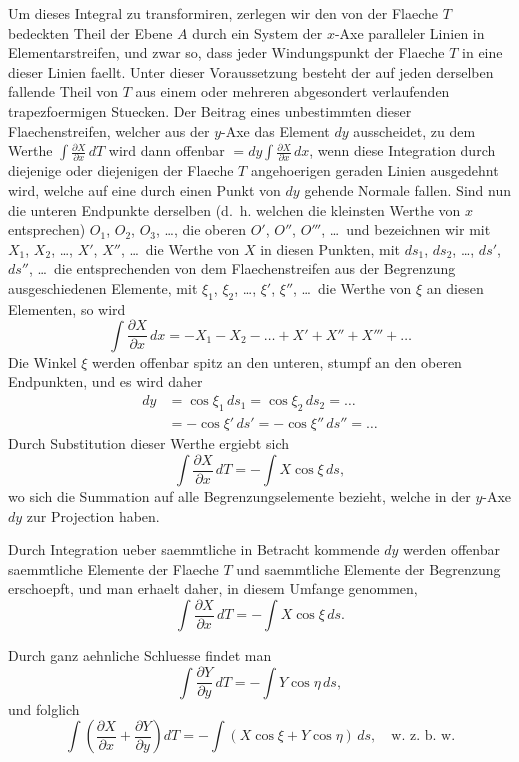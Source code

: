 \documentclass[11pt,a4paper]{article}
\theoremstyle{plain}
\theoremstyle{definition}
\begin{document}
Um dieses Integral zu transformiren, zerlegen wir den von der Flaeche $T$ bedeckten Theil der Ebene $A$ durch ein System der $x$-Axe paralleler Linien in Elementarstreifen, und zwar so, dass jeder Windungspunkt der Flaeche $T$ in eine dieser Linien faellt. Unter dieser Voraussetzung besteht der auf jeden derselben fallende Theil von $T$ aus einem oder mehreren abgesondert verlaufenden trapezfoermigen Stuecken. Der Beitrag eines unbestimmten dieser Flaechenstreifen, welcher aus der $y$-Axe das Element $dy$ ausscheidet, zu dem Werthe $\int \frac{\partial X}{\partial x} \, dT$ wird dann offenbar $= dy \int \frac{\partial X}{\partial x} \, dx$, wenn diese Integration durch diejenige oder diejenigen der Flaeche $T$ angehoerigen geraden Linien ausgedehnt wird, welche auf eine durch einen Punkt von $dy$ gehende Normale fallen. Sind nun die unteren Endpunkte derselben (d.\ h. welchen die kleinsten Werthe von $x$ entsprechen) $O_1$, $O_2$, $O_3$, \dots, die oberen $O'$, $O''$, $O'''$, \dots\ und bezeichnen wir mit $X_1$, $X_2$, \dots, $X'$, $X''$, \dots\ die Werthe von $X$ in diesen Punkten, mit $ds_1$, $ds_2$, \dots, $ds'$, $ds''$, \dots\ die entsprechenden von dem Flaechenstreifen aus der Begrenzung ausgeschiedenen Elemente, mit $\xi_1$, $\xi_2$, \dots, $\xi'$, $\xi''$, \dots\ die Werthe von $\xi$ an diesen Elementen, so wird
\[
\int \frac{\partial X}{\partial x} \, dx = -X_1 - X_2 - \dots + X' + X'' + X''' + \dots
\]
Die Winkel $\xi$ werden offenbar spitz an den unteren, stumpf an den oberen Endpunkten, und es wird daher
\begin{align*}
dy &= \cos\xi_1 \, ds_1 = \cos\xi_2 \, ds_2 = \dots \\
   &= -\cos\xi' \, ds' = -\cos\xi'' \, ds'' = \dots
\end{align*}
Durch Substitution dieser Werthe ergiebt sich
\[
\int \frac{\partial X}{\partial x} \, dT = -\int X \cos\xi \, ds,
\]
wo sich die Summation auf alle Begrenzungselemente bezieht, welche in der $y$-Axe $dy$ zur Projection haben.

Durch Integration ueber saemmtliche in Betracht kommende $dy$ werden offenbar saemmtliche Elemente der Flaeche $T$ und saemmtliche Elemente der Begrenzung erschoepft, und man erhaelt daher, in diesem Umfange genommen,
\[
\int \frac{\partial X}{\partial x} \, dT = -\int X \cos\xi \, ds.
\]

Durch ganz aehnliche Schluesse findet man
\[
\int \frac{\partial Y}{\partial y} \, dT = -\int Y \cos\eta \, ds,
\]
und folglich
\begin{equation}
\int \left(\frac{\partial X}{\partial x} + \frac{\partial Y}{\partial y}\right) dT = -\int (X \cos\xi + Y \cos\eta) \, ds, \quad \text{w.\ z.\ b.\ w.}
\end{equation}
\end{document}
